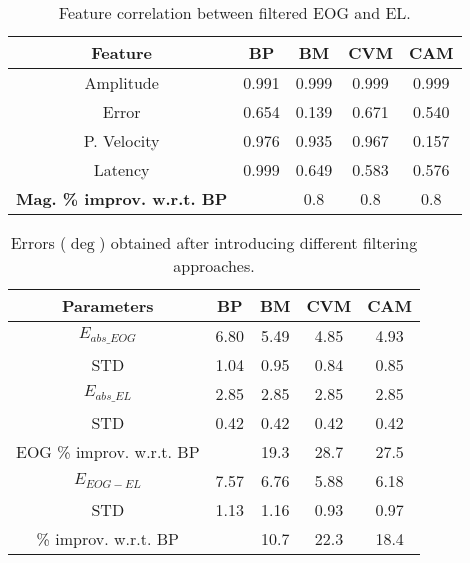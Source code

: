 \documentclass[transmag]{IEEEtran}
\begin{document}
\begin{table}[h]
	\caption{Feature correlation between filtered EOG and EL.}
	\label{tabl4}
	\begin{center}
		\begin{tabular}{|c|c|c|c|c|} \hline
			\textbf{Feature}					&  \textbf{BP}			& \textbf{BM}	& 	\textbf{CVM} 	& 	\textbf{CAM}	 \\ \hline
			Amplitude   &  0.991  & 0.999	& 0.999	& 0.999\\ \hline
			Error    &  0.654  & 0.139	& 0.671	& 0.540\\ \hline
			P. Velocity	&  0.976  & 0.935	& 0.967 & 0.157   \\ \hline
			Latency		&  0.999  & 0.649	& 0.583	& 0.576\\ \hline		
			\textbf{Mag. \% improv. w.r.t. BP}		&  \cellcolor{black}	&  0.8			& 	0.8	 			& 	0.8 \\ \hline		
		\end{tabular}
	\end{center}
	
\end{table}


\begin{table}[h]
	\caption{Errors ($\si{\deg}$) obtained after introducing different filtering approaches.}
	\label{tabl5}
	\begin{center}
		\begin{tabular}{|c|c|c|c|c|} \hline
			\textbf{Parameters}					&  \textbf{BP}		& \textbf{BM}	& 	\textbf{CVM} & \textbf{CAM}	 \\ \hline
			$E_{abs\_EOG}$	&  6.80		& 5.49		& 	4.85	& 	4.93 \\ \hline
			STD				&  1.04		& 0.95		& 	0.84	& 	0.85 \\ \hline
			$E_{abs\_EL}$	&  2.85		& 2.85		& 	2.85	& 	2.85 \\ \hline
			STD				&  0.42		& 0.42 	 	& 	0.42	& 	0.42 \\ \hline		
			EOG \% improv. w.r.t. BP	
			&  	\cellcolor{black}		&  19.3 	&  28.7 	 &  27.5\\ \hline
			$E_{EOG-EL}$	&  7.57 	&  6.76 	& 	5.88	 & 	6.18 \\ \hline
			STD				&  1.13		&  1.16		& 	0.93	 & 	0.97 \\ \hline		
			\% improv. w.r.t. BP		
			&  		\cellcolor{black}	&  10.7		& 22.3	 	 & 	18.4 \\ \hline		
			
			\hline
		\end{tabular}
	\end{center}
	
\end{table}
\end{document}
